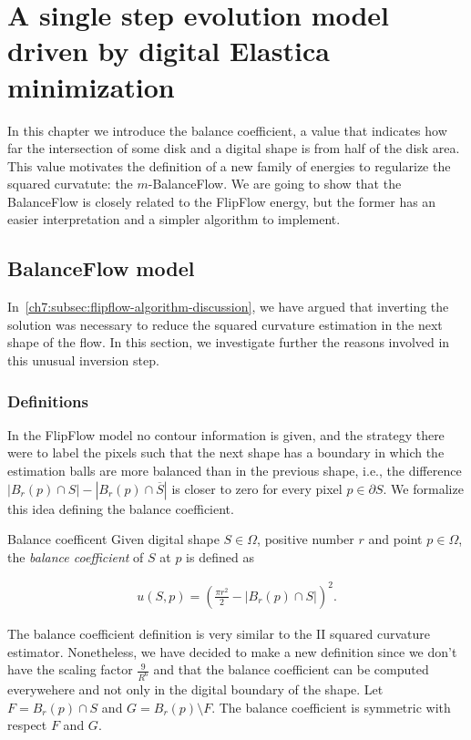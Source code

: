 \chapter{A single step evolution model driven by digital Elastica minimization}
\label{chapter:balance-flow}


In this chapter we introduce the balance coefficient, a value that indicates how far the intersection of some disk and a digital shape is from half of the disk area. This value motivates the definition of a new family of energies to regularize the squared curvatute: the $m$-BalanceFlow. We are going to show that the BalanceFlow is closely related to the FlipFlow energy, but the former has an easier interpretation and a simpler algorithm to implement.


\section{BalanceFlow model}
In~\cref{ch7:subsec:flipflow-algorithm-discussion}, we have argued that inverting the solution was necessary to reduce the squared curvature estimation in the next shape of the flow. In this section, we investigate further the reasons involved in this unusual inversion step. 

\subsection{Definitions}

In the FlipFlow model no contour information is given, and the strategy there were to label the pixels such that the next shape has a boundary in which the estimation balls are more balanced than in the previous shape, i.e., the difference $|B_r(p) \cap S| - |B_r(p) \cap \overline{S}|$ is closer to zero for every pixel $p \in \partial S$.  We formalize this idea defining the balance coefficient.

\begin{definition}{Balance coefficent}
Given digital shape $S \in \Omega$, positive number $r$ and point $p \in \Omega$, the \emph{balance coefficient} of $S$ at $p$ is defined as

\begin{align*}
	u(S,p) = \left( \frac{\pi r^2}{2} - |B_r(p) \cap S| \right)^2.
\end{align*}

\end{definition}

The balance coefficient definition is very similar to the II squared curvature estimator. Nonetheless, we have decided to make a new definition since we don't have the scaling factor $\frac{9}{R^6}$ and that the balance coefficient can be computed everywehere and not only in the digital boundary of the shape. Let $F=B_r(p) \cap S$ and $G=B_r(p) \setminus F$. The balance coefficient is symmetric with respect $F$ and $G$. 

